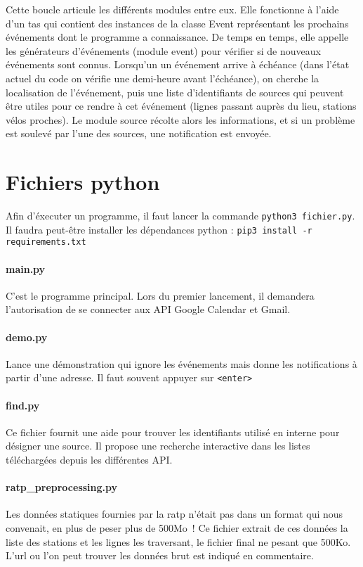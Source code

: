 \documentclass[a4paper, 8pt]{article}
\begin{document}
Cette boucle articule les différents modules entre eux.
Elle fonctionne à l'aide d'un tas qui contient des instances de la classe Event
représentant les prochains événements dont le programme a connaissance.
De temps en temps, elle appelle les générateurs d'événements (module event) pour
vérifier si de nouveaux événements sont connus.
Lorsqu'un un événement arrive à échéance (dans l'état actuel du code on vérifie une
demi-heure avant l'échéance), on cherche la localisation de l'événement, puis
une liste d'identifiants de sources qui peuvent être utiles pour ce rendre à cet
événement (lignes passant auprès du lieu, stations vélos proches).
Le module source récolte alors les informations, et si un problème est soulevé
par l'une des sources, une notification est envoyée.


\section{Fichiers python}

Afin d'éxecuter un programme, il faut lancer la commande
\texttt{python3 fichier.py}.
Il faudra peut-être installer les dépendances python :
\texttt{pip3 install -r requirements.txt}

\paragraph{main.py} C'est le programme principal. Lors du premier lancement,
il demandera l'autorisation de se connecter aux API Google Calendar et Gmail.

\paragraph{demo.py} Lance une démonstration qui ignore les événements mais donne les
notifications à partir d'une adresse. Il faut souvent appuyer sur
\texttt{<enter>}

\paragraph{find.py} Ce fichier fournit une aide
pour trouver les identifiants utilisé en interne pour désigner une source.
Il propose une recherche interactive dans les listes téléchargées depuis les
différentes API.

\paragraph{ratp\_preprocessing.py} Les données statiques fournies par la ratp
n'était pas dans un format qui nous convenait, en plus de peser plus de 500Mo~!
Ce fichier extrait de ces données la liste des stations et les lignes les
traversant, le fichier final ne pesant que 500Ko.
L'url ou l'on peut trouver les données brut est indiqué en
commentaire.
\end{document}
